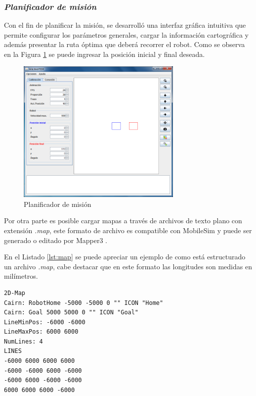 \documentclass[11pt,twoside,A5]{article}
\newcommand{\reflistings}[1]{Listado \ref{#1}}
\newcommand{\reffigure}[1]{Figura \ref{#1}}
\begin{document}
\subsubsection*{\textit{Planificador de misión}}

Con el fin de planificar la misión, se desarrolló una interfaz gráfica intuitiva que permite configurar
los parámetros generales, cargar la información cartográfica y además presentar la ruta óptima que deberá recorrer el robot. 
Como se observa en la \reffigure{fig:planificador} se puede ingresar la posición inicial y final deseada.

\begin{figure}[here]
\begin{center}
\includegraphics[width=8cm]{ventana-principal.png} 
\caption{Planificador de misión}
\label{fig:planificador}
\end{center}
\end{figure} 

Por otra parte es posible cargar mapas a través de archivos de texto plano con extensión \textit{.map}, 
este formato de archivo es compatible con MobileSim y puede ser generado o editado por
Mapper3 \cite{mapper2014}.

En el \reflistings{lst:map} se puede apreciar un ejemplo de como está estructurado un archivo \textit{.map},
cabe destacar que en este formato las longitudes son medidas en milímetros.

\begin{lstlisting}[caption={Ejemplo archivo mapa}, label=lst:map, frame=single, basicstyle=\footnotesize\ttfamily]
2D-Map
Cairn: RobotHome -5000 -5000 0 "" ICON "Home"
Cairn: Goal 5000 5000 0 "" ICON "Goal" 
LineMinPos: -6000 -6000
LineMaxPos: 6000 6000
NumLines: 4
LINES
-6000 6000 6000 6000
-6000 -6000 6000 -6000
-6000 6000 -6000 -6000
6000 6000 6000 -6000
\end{lstlisting}
\end{document}
